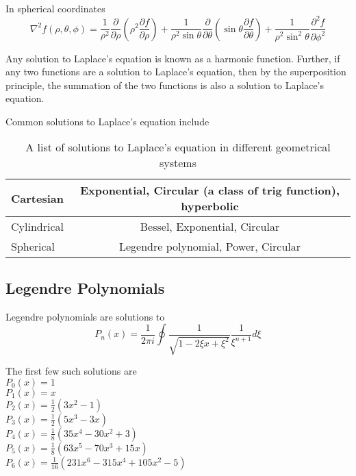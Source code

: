 \documentclass{article}
\numberwithin{equation}{subsection}
\begin{document}
In spherical coordinates
\begin{equation} \label{eq_laplace_spherical}
\nabla^2 f(\rho, \theta, \phi) = \frac{1}{\rho^2}\frac{\partial}{\partial \rho} \left( \rho^2 \frac{\partial f}{\partial \rho}\right) + \frac{1}{\rho^2 \sin \theta}\frac{\partial}{\partial \theta}\left( \sin \theta \frac{\partial f}{\partial \theta}\right) + \frac{1}{\rho^2 \sin^2 \theta} \frac{\partial^2 f}{\partial \phi^2}
\end{equation}

Any solution to Laplace's equation is known as a harmonic function. Further, if any two functions are a solution to Laplace's equation, then by the superposition principle, the summation of the two functions is also a solution to Laplace's equation.

Common solutions to Laplace's equation include

\begin{table}
\begin{center}
\label{tbl_laplace_solutions}
\caption{A list of solutions to Laplace's equation in different geometrical systems}
\begin{tabular}{|l|c|}
\hline
Cartesian & Exponential, Circular (a class of trig function), hyperbolic \\ \hline
Cylindrical & Bessel, Exponential, Circular \\ \hline
Spherical & Legendre polynomial, Power, Circular \\ \hline
\end{tabular}
\end{center}
\end{table}

\subsection{Legendre Polynomials} \label{sec_legendre}

Legendre polynomials are solutions to
\begin{equation}
P_n(x) = \frac{1}{2 \pi i} \oint \frac{1}{\sqrt{1-2\xi x + \xi^2}} \frac{1}{\xi^{n+1}} d\xi
\end{equation}



The first few such solutions are \\
$P_0(x) = 1$ \\
$P_1(x) = x$ \\
$P_2(x) = \frac{1}{2}(3x^2-1)$ \\
$P_3(x) = \frac{1}{2}(5x^3 - 3x)$ \\
$P_4(x) = \frac{1}{8}(35x^4 - 30x^2 + 3)$ \\
$P_5(x) = \frac{1}{8}(63x^5 - 70x^3 + 15x)$ \\
$P_6(x) = \frac{1}{16}(231x^6 - 315x^4 + 105x^2 - 5)$ \\
\end{document}

